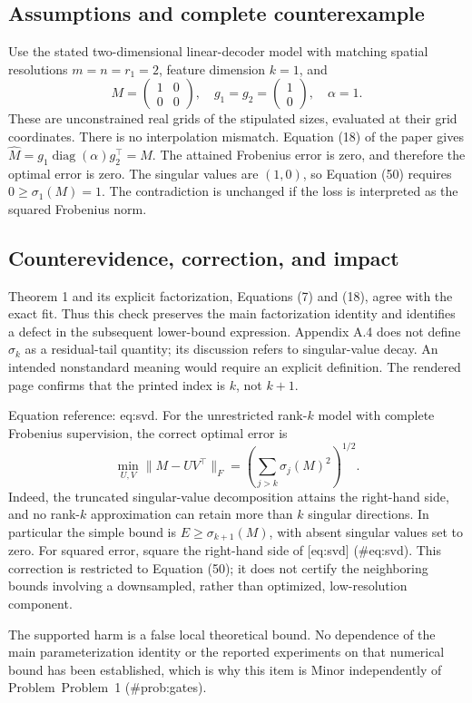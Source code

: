 \documentclass[10pt]{article}
\begin{document}
\subsection*{Assumptions and complete counterexample}
Use the stated two-dimensional linear-decoder model with matching spatial resolutions \(m=n=r_1=2\), feature dimension \(k=1\), and \[M=\begin{pmatrix}1&0\\0&0\end{pmatrix},\quad
 g_1=g_2=\begin{pmatrix}1\\0\end{pmatrix},\quad \alpha=1.\] These are unconstrained real grids of the stipulated sizes, evaluated at their grid coordinates. There is no interpolation mismatch. Equation (18) of the paper gives \(\widehat M=g_1\operatorname{diag}(\alpha)g_2^\top=M\). The attained Frobenius error is zero, and therefore the optimal error is zero. The singular values are \((1,0)\), so Equation (50) requires \(0\geq\sigma_1(M)=1\). The contradiction is unchanged if the loss is interpreted as the squared Frobenius norm.\par
\subsection*{Counterevidence, correction, and impact}
Theorem 1 and its explicit factorization, Equations (7) and (18), agree with the exact fit. Thus this check preserves the main factorization identity and identifies a defect in the subsequent lower-bound expression. Appendix A.4 does not define \(\sigma_k\) as a residual-tail quantity; its discussion refers to singular-value decay. An intended nonstandard meaning would require an explicit definition. The rendered page confirms that the printed index is \(k\), not \(k+1\).\par
Equation reference: eq:svd. For the unrestricted rank-\(k\) model with complete Frobenius supervision, the correct optimal error is \[
 \min_{U,V}\|M-UV^\top\|_F
 =\left(\sum_{j>k}\sigma_j(M)^2\right)^{1/2}.\] Indeed, the truncated singular-value decomposition attains the right-hand side, and no rank-\(k\) approximation can retain more than \(k\) singular directions. In particular the simple bound is \(E\geq\sigma_{k+1}(M)\), with absent singular values set to zero. For squared error, square the right-hand side of [eq:svd] (\#eq:svd). This correction is restricted to Equation (50); it does not certify the neighboring bounds involving a downsampled, rather than optimized, low-resolution component.\par
The supported harm is a false local theoretical bound. No dependence of the main parameterization identity or the reported experiments on that numerical bound has been established, which is why this item is Minor independently of Problem Problem 1 (\#prob:gates).\par
\end{document}
